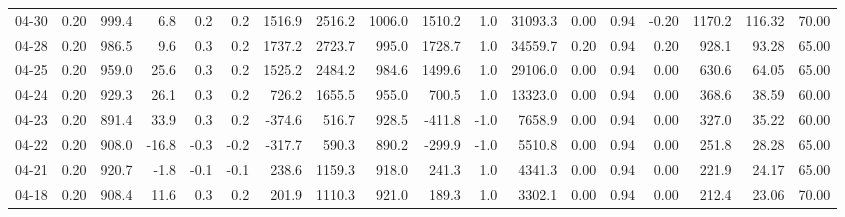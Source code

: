 \begin{threeparttable}
{\begin{tabular}{lrrrrrrrrrrrrrrrrr}
  04-30 &     0.20 &  999.4 &               6.8 &               0.2 &                0.2 &             1516.9 & 2516.2 & 1006.0 &     1510.2 &                      1.0 &             31093.3 &       0.00 &      0.94 &          -0.20 &           1170.2 &          116.32 &                  70.00 \\
  04-28 &     0.20 &  986.5 &               9.6 &               0.3 &                0.2 &             1737.2 & 2723.7 &  995.0 &     1728.7 &                      1.0 &             34559.7 &       0.20 &      0.94 &           0.20 &            928.1 &           93.28 &                  65.00 \\
  04-25 &     0.20 &  959.0 &              25.6 &               0.3 &                0.2 &             1525.2 & 2484.2 &  984.6 &     1499.6 &                      1.0 &             29106.0 &       0.00 &      0.94 &           0.00 &            630.6 &           64.05 &                  65.00 \\
  04-24 &     0.20 &  929.3 &              26.1 &               0.3 &                0.2 &              726.2 & 1655.5 &  955.0 &      700.5 &                      1.0 &             13323.0 &       0.00 &      0.94 &           0.00 &            368.6 &           38.59 &                  60.00 \\
  04-23 &     0.20 &  891.4 &              33.9 &               0.3 &                0.2 &             -374.6 &  516.7 &  928.5 &     -411.8 &                     -1.0 &              7658.9 &       0.00 &      0.94 &           0.00 &            327.0 &           35.22 &                  60.00 \\
  04-22 &     0.20 &  908.0 &             -16.8 &              -0.3 &               -0.2 &             -317.7 &  590.3 &  890.2 &     -299.9 &                     -1.0 &              5510.8 &       0.00 &      0.94 &           0.00 &            251.8 &           28.28 &                  65.00 \\
  04-21 &     0.20 &  920.7 &              -1.8 &              -0.1 &               -0.1 &              238.6 & 1159.3 &  918.0 &      241.3 &                      1.0 &              4341.3 &       0.00 &      0.94 &           0.00 &            221.9 &           24.17 &                  65.00 \\
  04-18 &     0.20 &  908.4 &              11.6 &               0.3 &                0.2 &              201.9 & 1110.3 &  921.0 &      189.3 &                      1.0 &              3302.1 &       0.00 &      0.94 &           0.00 &            212.4 &           23.06 &                  70.00 \\

\end{tabular}}
\end{threeparttable}
